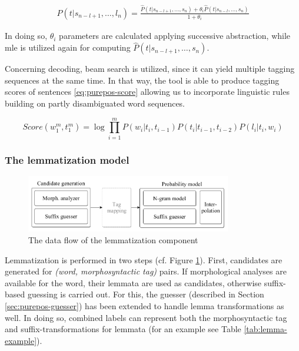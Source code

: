 \begin{align}
 P(t|s_{n-l+1}, \dots, l_n) 
 = \frac{ \hat{P}(t|s_{n-l+1}, \dots, s_n) + \theta_i \hat{P}(t|s_{n-l}, \dots, s_n)}{1+\theta_i}
\end{align}

In doing so, $\theta_i$ parameters are calculated applying successive abstraction, while \gls{mle} is utilized  again for computing $\hat{P}(t|s_{n-l+1}, \dots, s_n)$. 

Concerning decoding, beam search is utilized, since it can yield multiple tagging sequences at the same time. 
In that way, the tool is able to produce tagging scores of sentences \eqref{eq:purepos-score} allowing us to incorporate linguistic rules building on partly disambiguated word sequences. 

\begin{equation}\label{eq:purepos-score} %
Score(w_1^m,t_1^m) = \log \prod_{i=1}^m P(w_i|t_i,t_{i-1})P(t_i|t_{i-1},t_{i-2})P(l_i|t_i,w_i)
\end{equation}

\subsubsection{The lemmatization model}

\begin{figure}[ht]
  \centering
  \includegraphics[width=0.8\textwidth]{MorphTagging/lemma_arch.png} %
  \caption{The data flow of the lemmatization component}
  \label{fig:lemma-arch}
\end{figure}

Lemmatization is performed in two steps (cf. Figure \ref{fig:lemma-arch}). 
First, candidates are generated for \emph{(word, morphosyntactic tag)} pairs. 
If morphological analyses are available for the word, their lemmata are used as candidates, otherwise suffix-based guessing is carried out. 
For this, the guesser (described in Section \ref{sec:purepos-guesser}) has been extended to handle lemma transformations as well. 
In doing so, combined labels can represent both the morphosyntactic tag and suffix-transformations for lemmata (for an example see Table \ref{tab:lemma-example}).


